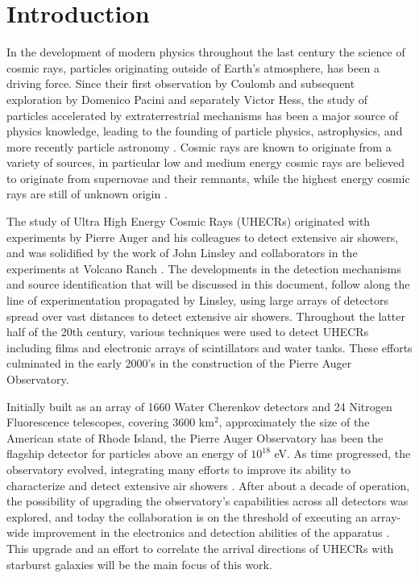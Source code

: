 
\chapter{Introduction}
\label{intro}
In the development of modern physics throughout the last century the science of cosmic rays, particles originating outside of Earth's atmosphere, has been a driving force. 
Since their first observation by Coulomb and subsequent exploration by Domenico Pacini and separately Victor Hess, the study of particles accelerated by extraterrestrial mechanisms has been a major source of physics knowledge, leading to the founding of particle physics, astrophysics, and more recently particle astronomy \cite{pacini}.  Cosmic rays are known to originate from a variety of sources, in particular low and medium energy cosmic rays are believed to originate from supernovae and their remnants, while the highest energy cosmic rays are still of unknown origin \cite{stanev}. 

The study of Ultra High Energy Cosmic Rays (UHECRs) originated with experiments by Pierre Auger and his colleagues to detect extensive air showers, and was solidified by the work of John Linsley and collaborators in the experiments at Volcano Ranch \cite{linsley}. The developments in the detection mechanisms and source identification that will be discussed in this document, follow along the line of experimentation propagated by Linsley, using large arrays of detectors spread over vast distances to detect extensive air showers. Throughout the latter half of the 20th century, various techniques were used to detect UHECRs including films and electronic arrays of scintillators and water tanks. These efforts culminated in the early 2000's in the construction of the Pierre Auger Observatory. 

Initially built as an array of 1660 Water Cherenkov detectors and 24 Nitrogen Fluorescence telescopes, covering 3600 km$^2$, approximately the size of the American state of Rhode Island, the Pierre Auger Observatory has been the flagship detector for particles above an energy of $10^{18}$ eV. As time progressed, the observatory evolved, integrating many efforts to improve its ability to characterize and detect extensive air showers \cite{enhancements}. After about a decade of operation, the possibility of upgrading the observatory's capabilities across all detectors was explored, and today the collaboration is on the threshold of executing an array-wide improvement in the electronics and detection abilities of the apparatus \cite{firstprime}. This upgrade and an effort to correlate the arrival directions of UHECRs with starburst galaxies will be the main focus of this work.


